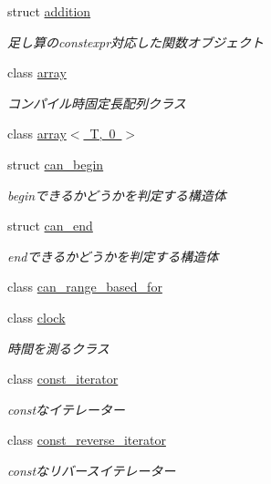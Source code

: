 \begin{DoxyCompactItemize}
\item 
struct \mbox{\hyperlink{structsaki_1_1addition}{addition}}
\begin{DoxyCompactList}\small\item\em 足し算のconstexpr対応した関数オブジェクト \end{DoxyCompactList}\item 
class \mbox{\hyperlink{classsaki_1_1array}{array}}
\begin{DoxyCompactList}\small\item\em コンパイル時固定長配列クラス \end{DoxyCompactList}\item 
class \mbox{\hyperlink{classsaki_1_1array_3_01_t_00_010_01_4}{array$<$ T, 0 $>$}}
\item 
struct \mbox{\hyperlink{structsaki_1_1can__begin}{can\+\_\+begin}}
\begin{DoxyCompactList}\small\item\em beginできるかどうかを判定する構造体 \end{DoxyCompactList}\item 
struct \mbox{\hyperlink{structsaki_1_1can__end}{can\+\_\+end}}
\begin{DoxyCompactList}\small\item\em endできるかどうかを判定する構造体 \end{DoxyCompactList}\item 
class \mbox{\hyperlink{classsaki_1_1can__range__based__for}{can\+\_\+range\+\_\+based\+\_\+for}}
\item 
class \mbox{\hyperlink{classsaki_1_1clock}{clock}}
\begin{DoxyCompactList}\small\item\em 時間を測るクラス \end{DoxyCompactList}\item 
class \mbox{\hyperlink{classsaki_1_1const__iterator}{const\+\_\+iterator}}
\begin{DoxyCompactList}\small\item\em constなイテレーター \end{DoxyCompactList}\item 
class \mbox{\hyperlink{classsaki_1_1const__reverse__iterator}{const\+\_\+reverse\+\_\+iterator}}
\begin{DoxyCompactList}\small\item\em constなリバースイテレーター \end{DoxyCompactList}\item 

\end{DoxyCompactItemize}
